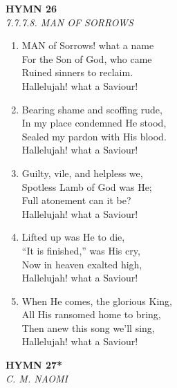\newpage
\begin{center}
    {\Large \textbf{HYMN 26}}
    \\
    \textit{7.7.7.8. MAN OF SORROWS}
\end{center}
\vspace{1em}

\begin{enumerate}
    \item MAN of Sorrows! what a name \\
        For the Son of God, who came \\
        Ruined sinners to reclaim. \\
        Hallelujah! what a Saviour!

    \item Bearing shame and scoffing rude, \\
        In my place condemned He stood, \\
        Sealed my pardon with His blood. \\
        Hallelujah! what a Saviour!

    \item Guilty, vile, and helpless we, \\
        Spotless Lamb of God was He; \\
        Full atonement can it be? \\
        Hallelujah! what a Saviour!

    \item Lifted up was He to die, \\
        ``It is finished,'' was His cry, \\
        Now in heaven exalted high, \\
        Hallelujah! what a Saviour!

    \item When He comes, the glorious King, \\
        All His ransomed home to bring, \\
        Then anew this song we'll sing, \\
        Hallelujah! what a Saviour!

\end{enumerate}

\newpage
\begin{center}
    {\Large \textbf{HYMN 27*}}
    \\
    \textit{C. M. NAOMI}
\end{center}
\vspace{1em}

